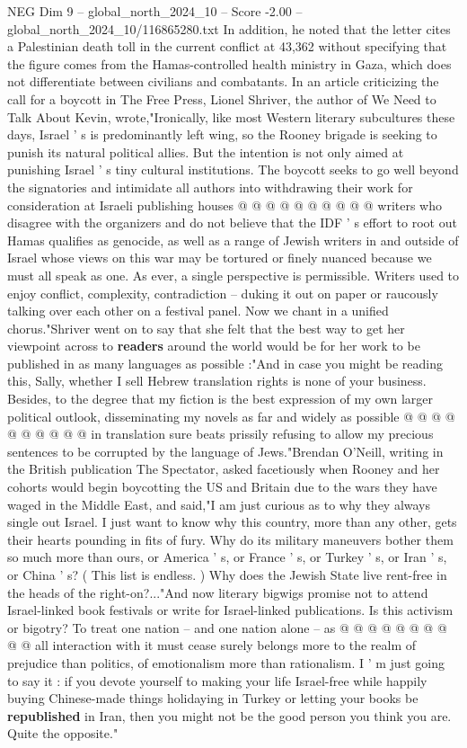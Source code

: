 \begin{textsample}{NEG Dim 9 – global\_north\_2024\_10 – Score -2.00 – global\_north\_2024\_10/116865280.txt}
In addition, he noted that the letter cites a Palestinian death toll in the current conflict at 43,362 without specifying that the figure comes from the Hamas-controlled health ministry in Gaza, which does not differentiate between civilians and combatants.
In an article criticizing the call for a boycott in The Free Press, Lionel Shriver, the author of We Need to Talk About Kevin, wrote,"Ironically, like most Western literary subcultures these days, Israel ' s is predominantly left wing, so the Rooney brigade is seeking to punish its natural political allies.
But the intention is not only aimed at punishing Israel ' s tiny cultural institutions.
The boycott seeks to go well beyond the signatories and intimidate all authors into withdrawing their work for consideration at Israeli publishing houses @ @ @ @ @ @ @ @ @ @ writers who disagree with the organizers and do not believe that the IDF ' s effort to root out Hamas qualifies as genocide, as well as a range of Jewish writers in and outside of Israel whose views on this war may be tortured or finely nuanced because we must all speak as one.
As ever, a single perspective is permissible.
Writers used to enjoy conflict, complexity, contradiction -- duking it out on paper or raucously talking over each other on a festival panel.
Now we chant in a unified chorus."Shriver went on to say that she felt that the best way to get her viewpoint across to \textbf{readers} around the world would be for her work to be published in as many languages as possible :"And in case you might be reading this, Sally, whether I sell Hebrew translation rights is none of your business.
Besides, to the degree that my fiction is the best expression of my own larger political outlook, disseminating my novels as far and widely as possible @ @ @ @ @ @ @ @ @ @ in translation sure beats prissily refusing to allow my precious sentences to be corrupted by the language of Jews."Brendan O'Neill, writing in the British publication The Spectator, asked facetiously when Rooney and her cohorts would begin boycotting the US and Britain due to the wars they have waged in the Middle East, and said,"I am just curious as to why they always single out Israel.
I just want to know why this country, more than any other, gets their hearts pounding in fits of fury.
Why do its military maneuvers bother them so much more than ours, or America ' s, or France ' s, or Turkey ' s, or Iran ' s, or China ' s? ( This list is endless. ) Why does the Jewish State live rent-free in the heads of the right-on?..."And now literary bigwigs promise not to attend Israel-linked book festivals or write for Israel-linked publications.
Is this activism or bigotry?
To treat one nation -- and one nation alone -- as @ @ @ @ @ @ @ @ @ @ all interaction with it must cease surely belongs more to the realm of prejudice than politics, of emotionalism more than rationalism.
I ' m just going to say it : if you devote yourself to making your life Israel-free while happily buying Chinese-made things holidaying in Turkey or letting your books be \textbf{republished} in Iran, then you might not be the good person you think you are.
Quite the opposite."

\end{textsample}
